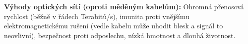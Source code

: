 \documentclass[a4paper,10pt]{article}
\begin{document}
\begin{vysvetlenibox}
\textbf{Výhody optických sítí (oproti měděným kabelům):}
Ohromná přenosová rychlost (běžně v řádech Terabitů/s), imunita proti vnějšímu elektromagnetickému rušení (vedle kabelu může uhodit blesk a signál to neovlivní), bezpečnost proti odposlechu, nízká hmotnost a dlouhá životnost.

\end{vysvetlenibox}
\end{document}
